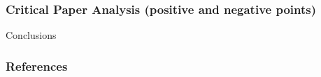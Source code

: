 \documentclass{beamer}
\begin{document}
\begin{frame}
\frametitle{Critical Paper Analysis (positive and negative points)}

\end{frame}


\begin{frame}{Conclusions}
 
\end{frame}


\begin{frame}
\frametitle{References}
\small


\end{frame}
\end{document}
